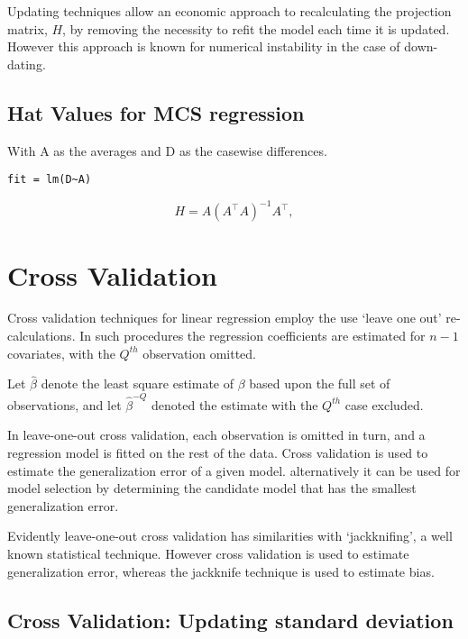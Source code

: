 \documentclass[12pt, a4paper]{article}
\begin{document}
Updating techniques allow an economic approach to recalculating the projection matrix, $H$, by removing the necessity to refit the model each time it is updated. However this approach is known for
numerical instability in the case of down-dating.



\subsection{Hat Values for MCS regression}

With A as the averages and D as the casewise differences.
\begin{verbatim}
fit = lm(D~A)
\end{verbatim}

\begin{displaymath}
H = A \left(A^\top  A\right)^{-1} A^\top ,
\end{displaymath}

\newpage
\section{Cross Validation} %

Cross validation techniques for linear regression employ the use `leave one out' re-calculations. In such procedures the regression coefficients are estimated for $n-1$ covariates, with the $Q^{th}$ observation omitted.

Let $\hat{\beta}$ denote the least square estimate of $\beta$ based upon the full set of observations, and let
$\hat{\beta}^{-Q}$ denoted the estimate with the $Q^{th}$ case
excluded.


In leave-one-out cross validation, each observation is omitted in turn, and a regression model is fitted on the rest of the data. Cross validation is used to estimate the generalization error of a given model. alternatively it can be used for model selection by determining the candidate model that has the smallest generalization error.


Evidently leave-one-out cross validation has similarities with `jackknifing', a well known statistical technique. However cross validation is used to estimate generalization error, whereas the jackknife technique is used to estimate bias.

\subsection{Cross Validation: Updating standard deviation} %
\end{document}
